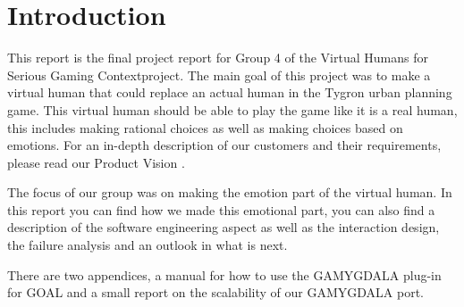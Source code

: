 \section{Introduction}
This report is the final project report for Group 4 of the Virtual Humans for Serious Gaming Contextproject. The main goal of this project was to make a virtual human that could replace an actual human in the Tygron \citep{tygron} urban planning game. This virtual human should be able to play the game like it is a real human, this includes making rational choices as well as making choices based on emotions. For an in-depth description of our customers and their requirements, please read our Product Vision \citep{vision}. \\ \par
The focus of our group was on making the emotion part of the virtual human. In this report you can find how we made this emotional part, you can also find a description of the software engineering aspect as well as the interaction design, the failure analysis and an outlook in what is next. \par
There are two appendices, a manual for how to use the GAMYGDALA plug-in for GOAL and a small report on the scalability of our GAMYGDALA port.
